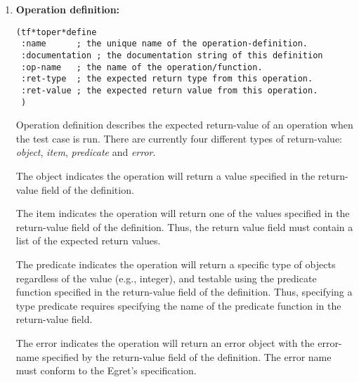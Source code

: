\begin {enumerate}
When running a test case, a specific test data must be included or nil if
no test-data is associated with this test case. In the above example,
both Valid-machine-name1 and Valid-machine-name2 are eligible for testing
s*sp*connect in a normal manner.  Thus, to test this particular scenario
of connection (normal connection) comprehensively, the test case
must be run twice, first with the test data Valid-machine-name1 and then 
with the test data Valid-machine-name2.

To test the operation s*sp*connect in general, other connection scenarios 
must be included.  These other scenarios are defined in  separate
test cases. We use the term {\it collection} when referring to a set of
test-cases which tests a specific operation, and the name of the collection
is the name of the operation to be tested.


\item {\bf Operation definition:}

\small\begin{verbatim}
(tf*toper*define
 :name  	; the unique name of the operation-definition.
 :documentation ; the documentation string of this definition
 :op-name	; the name of the operation/function.
 :ret-type	; the expected return type from this operation.
 :ret-value	; the expected return value from this operation.
 )
\end{verbatim}\normalsize

Operation definition describes the expected return-value of an operation
when the test case is run. There are currently four different
types of return-value: {\it object}, {\it item}, {\it predicate} and 
{\it error}.

The object indicates the operation will return a value 
specified in the return-value field of the definition. 

The item indicates the operation will return one of the values
specified in the return-value field of the definition.  Thus, the
return value field must contain a list of the expected return values.

The predicate indicates  the operation will return a specific 
type of objects regardless of the value (e.g., integer), and
testable using the predicate function specified in the return-value
field of the definition.  Thus, specifying a type predicate requires specifying
the name of the predicate function in the return-value field.

The error indicates the operation will return an error object 
with the error-name specified by the return-value field of the
definition. The error name must conform to the Egret's specification.


\end{enumerate}
